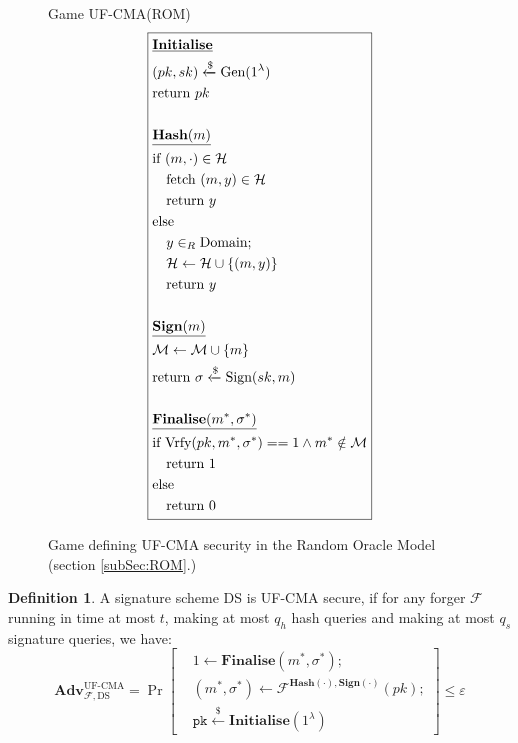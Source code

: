 \documentclass[]{final_report}
\theoremstyle{definition}
\newtheorem{definition}{Definition}[chapter]
\begin{document}
\begin{figure}[H]
\centering
\hfill Game UF-CMA(ROM)\hfill\phantom{} 
\[
\boxed{
\begin{aligned}
&\underline{\textbf{\text{Initialise}}} \\
&(pk, sk) \xleftarrow{\$} \text{Gen}(1^\lambda) \\
&\text{return } pk \\
\\
&\underline{\textbf{\text{Hash}}(m)} \\
&\text{if } (m, \cdot) \in \mathcal{H} \\
&\quad \text{fetch } (m, y) \in \mathcal{H} \\
&\quad \text{return } y \\
&\text{else} \\
&\quad y \in_{R} \text{Domain}; \\
&\quad \mathcal{H} \leftarrow \mathcal{H} \cup\{(m, y)\} \\
&\quad \text{return } y \\
\\
&\underline{\textbf{\text{Sign}}(m)} \\
&\mathcal{M} \leftarrow \mathcal{M} \cup\{m\} \\
&\text{return } \sigma \xleftarrow{\$} \text{Sign}(sk, m) \\
\\
&\underline{\textbf{\text{Finalise}}(m^*, \sigma^*)} \\
&\text{if Vrfy}(pk, m^*, \sigma^*) == 1 \land m^* \notin \mathcal{M} \\
&\quad \text{return } 1 \\
&\text{else} \\
&\quad \text{return } 0
\end{aligned}
}
\]
\caption{Game defining UF-CMA security in the Random Oracle Model (section \ref{subSec:ROM}.)}
\label{fig:crypto_game}
\end{figure}
\begin{definition}
A signature scheme DS is UF-CMA secure, if for any forger $\mathcal{F}$ running in time at most $t$, making at most $q_h$ hash queries and making at most $q_s$ signature queries, we have:
\[
\textbf{Adv}_{\mathcal{F},\text{DS}}^{\text{UF-CMA}} = \Pr \left[ \begin{aligned} &1 \leftarrow \textbf{Finalise}(m^*, \sigma^*); \\ &(m^*, \sigma^*) \leftarrow \mathcal{F}^{\textbf{Hash}(\cdot),\textbf{Sign}(\cdot)}(pk); \\ &\texttt{pk} \xleftarrow{\$} \textbf{Initialise}(1^{\lambda}) \end{aligned} \right] \leq \varepsilon
\]
\end{definition}
\end{document}
